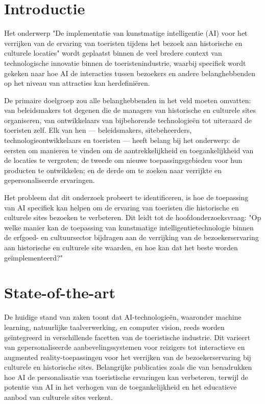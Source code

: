 
\section{Introductie}%
\label{sec:introductie}

Het onderwerp "De implementatie van kunstmatige intelligentie (AI) voor het verrijken van de ervaring van toeristen tijdens het bezoek aan historische en culturele locaties" wordt geplaatst binnen de veel bredere context van technologische innovatie binnen de toeristenindustrie, waarbij specifiek wordt gekeken naar hoe AI de interacties tussen bezoekers en andere belanghebbenden op het niveau van attracties kan herdefiniëren.

De primaire doelgroep zou alle belanghebbenden in het veld moeten omvatten: van beleidsmakers tot degenen die de managers van historische en culturele sites organiseren, van ontwikkelaars van bijbehorende technologieën tot uiteraard de toeristen zelf. Elk van hen — beleidsmakers, sitebeheerders, technologieontwikkelaars en toeristen — heeft belang bij het onderwerp: de eersten om manieren te vinden om de aantrekkelijkheid en toegankelijkheid van de locaties te vergroten; de tweede om nieuwe toepassingsgebieden voor hun producten te ontwikkelen; en de derde om te zoeken naar verrijkte en gepersonaliseerde ervaringen.

Het probleem dat dit onderzoek probeert te identificeren, is hoe de toepassing van AI specifiek kan helpen om de ervaring van toeristen die historische en culturele sites bezoeken te verbeteren. Dit leidt tot de hoofdonderzoeksvraag: "Op welke manier kan de toepassing van kunstmatige intelligentietechnologie binnen de erfgoed- en cultuursector bijdragen aan de verrijking van de bezoekerservaring aan historische en culturele site waarden, en hoe kan dat het beste worden geïmplementeerd?"

\section{State-of-the-art}%
\label{sec:state-of-the-art}


De huidige stand van zaken toont dat AI-technologieën, waaronder machine learning, natuurlijke taalverwerking, en computer vision, reeds worden geïntegreerd in verschillende facetten van de toeristische industrie. Dit varieert van gepersonaliseerde aanbevelingssystemen voor reizigers tot interactieve en augmented reality-toepassingen voor het verrijken van de bezoekerservaring bij culturele en historische sites. Belangrijke publicaties zoals die van \autocite{Zhou2018} benadrukken hoe AI de personalisatie van toeristische ervaringen kan verbeteren, terwijl \autocite{Umerov2023InnovativeDO} de potentie van AI in het verhogen van de toegankelijkheid en het educatieve aanbod van culturele sites verkent.

